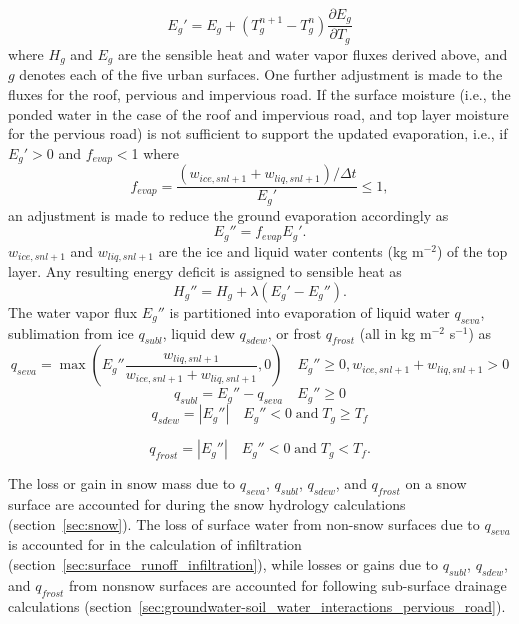 \documentclass[12pt,authoryear]{elsarticle}
\numberwithin{equation}{section} %
\begin{document}
\begin{equation}
E_{g}'=E_{g}+(T_{g}^{n+1}-T_{g}^{n})\frac{\partial E_{g}}{\partial T_{g}}
\end{equation}
where $H_{g}$ and $E_{g}$ are the sensible heat and water vapor fluxes derived above, and $g$ denotes each of the five urban surfaces. One further adjustment is made to the fluxes for the roof, pervious and impervious road. If the surface moisture (i.e., the ponded water in the case of the roof and impervious road, and top layer moisture for the pervious road) is not sufficient to support the updated evaporation, i.e., if $E_{g}'>$0 and $f_{evap}<$1 where
\begin{equation}
f_{evap}=\frac{(w_{ice,snl+1}+w_{liq,snl+1})/\Delta t}{E_{g}'} \leq1,
\end{equation}
an adjustment is made to reduce the ground evaporation accordingly as
\begin{equation}
E_{g}''=f_{evap}E_{g}'.
\end{equation}
$w_{ice,snl+1}$ and $w_{liq,snl+1}$ are the ice and liquid water contents (kg m$^{-2}$) of the top layer. Any resulting energy deficit is assigned to sensible heat as 
\begin{equation}
H_{g}''=H_{g}+\lambda(E_{g}'-E_{g}'').
\end{equation}
The water vapor flux $E_{g}''$ is partitioned into evaporation of liquid water $q_{seva}$, sublimation from ice $q_{subl}$, liquid dew $q_{sdew}$, or frost $q_{frost}$ (all in kg m$^{-2}$ s$^{-1}$) as
\begin{equation}
q_{seva}=\max\left(E_{g}''\frac{w_{liq,snl+1}}{w_{ice,snl+1}+w_{liq,snl+1}},0\right) \quad E_{g}'' \geq 0, w_{ice,snl+1}+w_{liq,snl+1}>0
\end{equation}
\begin{equation}
q_{subl}=E_{g}''-q_{seva} \quad E_{g}'' \geq 0
\end{equation}
\begin{equation}
q_{sdew}=|E_{g}''| \quad E_{g}''<0 \; \textrm{and}\; T_{g} \geq T_{f}
\end{equation}

\begin{equation}
q_{frost} = |E_{g}''| \quad E_{g}''<0 \;\textrm{and} \;T_{g} < T_{f}.
\end{equation}

The loss or gain in snow mass due to $q_{seva}$, $q_{subl}$, $q_{sdew}$, and $q_{frost}$ on a snow surface are accounted for during the snow hydrology calculations (section~\ref{sec:snow}). The loss of surface water from non-snow surfaces due to $q_{seva}$ is accounted for in the calculation of infiltration (section~\ref{sec:surface_runoff_infiltration}), while losses or gains due to $q_{subl}$, $q_{sdew}$, and $q_{frost}$ from nonsnow surfaces are accounted for following sub-surface drainage calculations (section~\ref{sec:groundwater-soil_water_interactions_pervious_road}).
\end{document}
